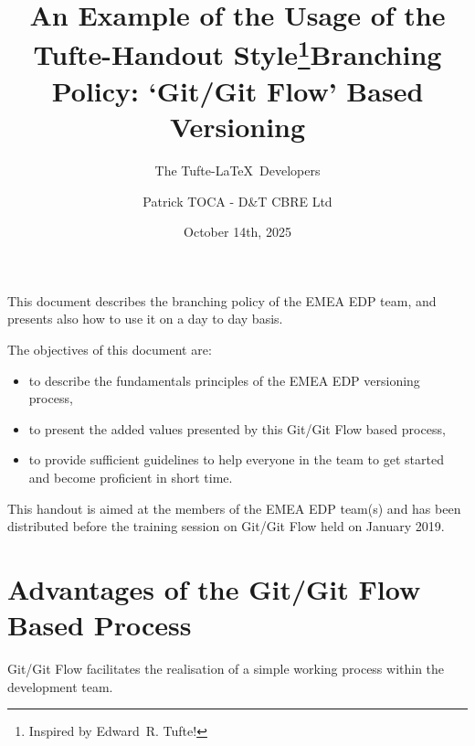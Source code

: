 \documentclass{tufte-handout}
\title{An Example of the Usage of the Tufte-Handout Style\thanks{Inspired by Edward~R. Tufte!}}
\author[The Tufte-LaTeX Developers]{The Tufte-\LaTeX\ Developers}
\title{Branching Policy: `Git/Git Flow' Based Versioning}
\author{Patrick TOCA - D\&T CBRE Ltd}
\date{October 14th, 2025 \footnotetext[1]{created on December 20th, 2018}}
\begin{document}
	
	\maketitle
	
	This document describes the branching policy of the EMEA EDP team, and presents also how to use it on a day to day basis.
	
		
	
	The objectives of this document are:
	\begin{itemize}
		\item to describe the fundamentals principles of the EMEA EDP versioning process,
		\item to present the added values presented by this Git/Git Flow based process,
		\item to provide sufficient guidelines to help everyone in the team to get started and become proficient in short time.
	\end{itemize}
	
	This handout is aimed at the members of the EMEA EDP team(s) and has been distributed before the training session on Git/Git Flow held on January 2019.
	
	\section{Advantages of the Git/Git Flow Based Process}
	
	Git/Git Flow facilitates the realisation of a simple working process within the development team.
	
\end{document}
